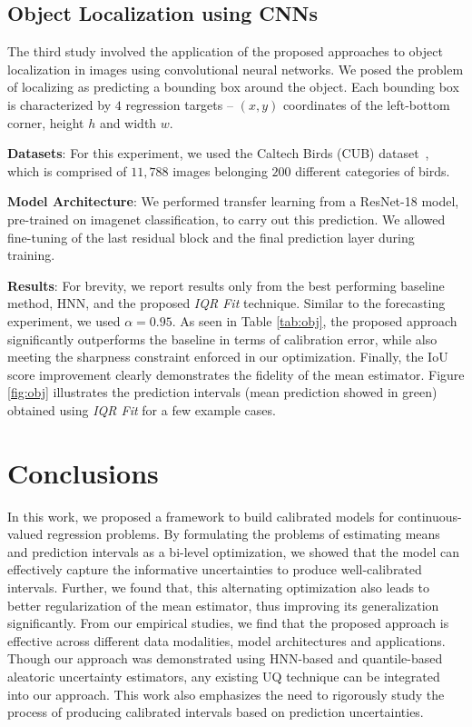\documentclass[letterpaper]{article} %
\begin{document}
\subsection{Object Localization using CNNs}
The third study  involved the application of the proposed approaches to object localization in images using convolutional neural networks. We posed the problem of localizing as predicting a bounding box around the object. Each bounding box is characterized by $4$ regression targets -- $(x,y)$ coordinates of the left-bottom corner, height $h$ and width $w$.

\noindent \textbf{Datasets}: For this experiment, we used the Caltech Birds (CUB) dataset~\cite{WelinderEtal2010CUB}, which is comprised of $11,788$ images belonging $200$ different categories of birds.

\noindent \textbf{Model Architecture}: We performed transfer learning from a ResNet-18 model, pre-trained on imagenet classification, to carry out this prediction. We allowed fine-tuning of the last residual block and the final prediction layer during training.

\noindent \textbf{Results}: For brevity, we report results only from the best performing baseline method, HNN, and the proposed \textit{IQR Fit} technique. Similar to the forecasting experiment, we used $\alpha = 0.95$. As seen in Table \ref{tab:obj}, the proposed approach significantly outperforms the baseline in terms of calibration error, while also meeting the sharpness constraint enforced in our optimization. Finally, the IoU score improvement clearly demonstrates the fidelity of the mean estimator. Figure \ref{fig:obj} illustrates the prediction intervals (mean prediction showed in green) obtained using \textit{IQR Fit} for a few example cases.

\section{Conclusions}
In this work, we proposed a framework to build calibrated models for continuous-valued regression problems. By formulating the problems of estimating means and prediction intervals as a bi-level optimization, we showed that the model can effectively capture the informative uncertainties to produce well-calibrated intervals. Further, we found that, this alternating optimization also leads to better regularization of the mean estimator, thus improving its generalization significantly. From our empirical studies, we find that the proposed approach is effective across different data modalities, model architectures and applications. Though our approach was demonstrated using HNN-based and quantile-based aleatoric uncertainty estimators, any existing UQ technique can be integrated into our approach. This work also emphasizes the need to rigorously study the process of producing calibrated intervals based on prediction uncertainties.
\end{document}
